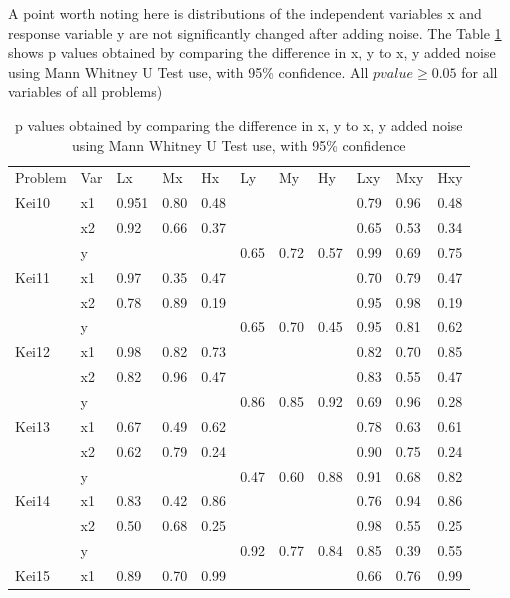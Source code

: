 A point worth noting here is distributions of the independent variables x and response variable y are not significantly changed after adding noise. The Table \ref{tab:pvalueNoise} shows p values obtained by comparing the difference in x, y to x, y added noise using Mann Whitney U Test use, with 95\% confidence. All $p value \ge 0.05$ for all variables of all problems) \par
\begin{table}
\caption{p values obtained by comparing the difference in x, y to x, y added noise using Mann Whitney U Test use, with 95\% confidence}
\label{tab:pvalueNoise}       %
\begin{tabular}{lllllllllll}
\hline\noalign{\smallskip}
Problem & Var & Lx & Mx & Hx & Ly & My & Hy & Lxy & Mxy & Hxy \\
\noalign{\smallskip}\hline\noalign{\smallskip}
Kei10 & x1 & 0.951 & 0.80 & 0.48 &  &  &  & 0.79 & 0.96 & 0.48 \\
& x2 & 0.92 & 0.66 & 0.37 & & & & 0.65 & 0.53 & 0.34 \\
& y &  & & & 0.65 & 0.72 & 0.57 & 0.99 & 0.69 & 0.75 \\
Kei11 & x1 & 0.97 & 0.35 & 0.47 & &  &  & 0.70 & 0.79 & 0.47 \\
& x2 & 0.78 & 0.89 & 0.19 &  &  & & 0.95 & 0.98 & 0.19 \\
& y & & & & 0.65 & 0.70 & 0.45 & 0.95 & 0.81 & 0.62 \\
Kei12 & x1 & 0.98 & 0.82 & 0.73 & & & & 0.82 & 0.70 & 0.85 \\
& x2 & 0.82 & 0.96 & 0.47 &  &  & & 0.83 & 0.55 & 0.47 \\
& y & & & & 0.86 & 0.85 & 0.92 & 0.69 & 0.96 & 0.28 \\
Kei13 & x1 & 0.67 & 0.49 & 0.62 & & & & 0.78 & 0.63 & 0.61 \\
& x2 & 0.62 & 0.79 & 0.24 & & & & 0.90 & 0.75 & 0.24 \\
& y & & & & 0.47 & 0.60 & 0.88 & 0.91 & 0.68 & 0.82 \\
Kei14 & x1 & 0.83 & 0.42 & 0.86 & & & & 0.76 & 0.94 & 0.86 \\
& x2 & 0.50 & 0.68 & 0.25 & & & & 0.98 & 0.55 & 0.25 \\
& y & & & & 0.92 & 0.77 & 0.84 & 0.85 & 0.39 & 0.55 \\
Kei15 & x1 & 0.89 & 0.70 & 0.99 & & & & 0.66 & 0.76 & 0.99 \\

\end{tabular}
\end{table}
